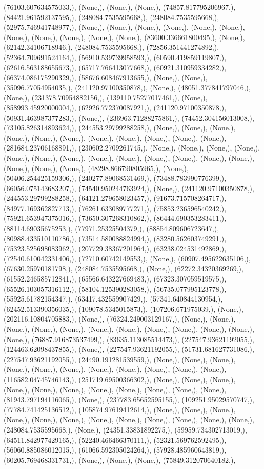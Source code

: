 \documentclass{article}
\begin{document}
(76103.607634575033,), (None,), (None,), (None,), (74857.817795206967,), (84421.961592137595,), (248084.7535595668,), (248084.7535595668,), (52975.746941748977,), (None,), (None,), (None,), (None,), (None,), (None,), (None,), (None,), (None,), (None,), (None,), (83600.336661800495,), (None,), (62142.34106718946,), (248084.7535595668,), (72856.351441274892,), (52364.709691524164,), (56910.539739958593,), (60590.419859119807,), (62616.563188655673,), (65717.766413077668,), (60921.310959334282,), (66374.086175290329,), (58676.608467913655,), (None,), (None,), (35096.77054954035,), (241120.97100350878,), (None,), (48051.377841797046,), (None,), (231378.70954882156,), (139110.75277017461,), (None,), (858993.45920000004,), (62926.772370087921,), (241120.97100350878,), (50931.463987377283,), (None,), (236963.71288275861,), (74452.304156013008,), (73105.826314893624,), (244553.29799288258,), (None,), (None,), (None,), (None,), (None,), (None,), (None,), (None,), (None,), (None,), (None,), (281684.23706168891,), (230602.2709261745,), (None,), (None,), (None,), (None,), (None,), (None,), (None,), (None,), (None,), (None,), (None,), (None,), (None,), (None,), (None,), (None,), (48298.866790805965,), (None,), (50406.254425159306,), (240277.89068531469,), (73488.783990776399,), (66056.075143683207,), (74540.950244763924,), (None,), (241120.97100350878,), (244553.29799288258,), (64121.279658023457,), (91673.715708264717,), (84977.169362827713,), (76261.633089777271,), (75853.236596540242,), (75921.653947375016,), (73650.307268310862,), (86444.690353283411,), (88114.69035675253,), (77971.25325504379,), (88854.809606723647,), (80988.433510110786,), (73514.580088824994,), (83280.562603749291,), (75323.525698083962,), (207729.38367201964,), (63238.024531492869,), (72540.610042331406,), (72710.60742149553,), (None,), (60907.495622635106,), (67630.25970181798,), (248084.7535595668,), (None,), (62272.34320369269,), (61552.246585712841,), (65566.643227669483,), (67323.307059519575,), (65526.103057316112,), (58104.125390283058,), (56735.077995123778,), (55925.61782154347,), (63417.432559907429,), (57341.640844130954,), (62452.513390356035,), (109078.5345015873,), (107206.671975039,), (None,), (202116.10804705883,), (None,), (76324.249003129167,), (None,), (None,), (None,), (None,), (None,), (None,), (None,), (None,), (None,), (None,), (None,), (None,), (76887.916873537499,), (83635.113085514473,), (227547.93621192055,), (124463.62098437855,), (None,), (227547.93621192055,), (51731.681627731086,), (227547.93621192055,), (24490.191281539559,), (None,), (None,), (None,), (None,), (None,), (None,), (None,), (None,), (None,), (None,), (None,), (116582.04745746143,), (251719.69500366302,), (None,), (None,), (None,), (None,), (None,), (None,), (None,), (None,), (None,), (None,), (None,), (81943.797194116065,), (None,), (237783.65652595155,), (109251.95029570747,), (77784.741425136512,), (105874.97619412614,), (None,), (None,), (None,), (None,), (None,), (None,), (None,), (None,), (None,), (None,), (None,), (None,), (248084.7535595668,), (None,), (24351.33831892275,), (59959.734302713019,), (64511.842977429165,), (52240.466466370111,), (52321.569762592495,), (56060.885086012015,), (61066.592305024264,), (57928.485960643819,), (60205.769468331731,), (None,), (None,), (None,), (75849.312070640182,), 
\end{document}
